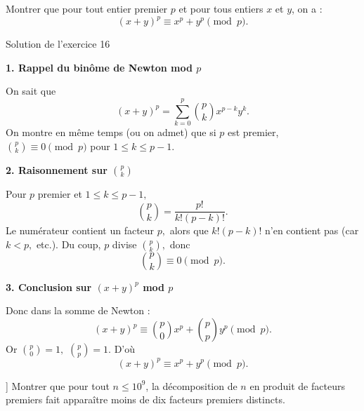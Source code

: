 \documentclass[a4paper,12pt]{article}
\begin{document}
\begin{exercice}[title=Exercice 16 $\star\star$ -- {[Calculer, Raisonner]}]
Montrer que pour tout entier premier $p$ et pour tous entiers $x$ et $y$, on a :
$$
(x + y)^p \equiv x^p + y^p \pmod{p}.
$$
\end{exercice}

\begin{solutionbox}{Solution de l'exercice 16}

\textbf{1. Rappel du binôme de Newton mod $p$}

On sait que 
\[
(x+y)^p = \sum_{k=0}^{p} \binom{p}{k} x^{p-k} y^k.
\]
On montre en même temps (ou on admet) que si $p$ est premier, $\binom{p}{k}\equiv 0\pmod{p}$ pour $1\le k\le p-1.$

\textbf{2. Raisonnement sur $\binom{p}{k}$}

Pour $p$ premier et $1\le k\le p-1,$  
\[
\binom{p}{k} = \frac{p!}{k!(p-k)!}.
\]
Le numérateur contient un facteur $p,$ alors que $k!(p-k)!$ n’en contient pas (car $k<p,$ etc.). Du coup, $p$ divise $\binom{p}{k},$ donc 
\[
\binom{p}{k}\equiv0 \pmod{p}.
\]

\textbf{3. Conclusion sur $(x+y)^p$ mod $p$}

Donc dans la somme de Newton :
\[
(x+y)^p 
\equiv \binom{p}{0}x^p + \binom{p}{p}y^p
\pmod{p}.
\]
Or $\binom{p}{0}=1,$ $\binom{p}{p}=1.$ D’où 
\[
(x+y)^p \equiv x^p + y^p\pmod{p}.
\]

\end{solutionbox}

\begin{exercice}[title=Exercice 17 $\star\star$ -- [Chercher]]
Montrer que pour tout $n \le 10^9$, la décomposition de $n$ en produit de facteurs premiers fait apparaître moins de dix facteurs premiers distincts.
\end{exercice}
\end{document}
